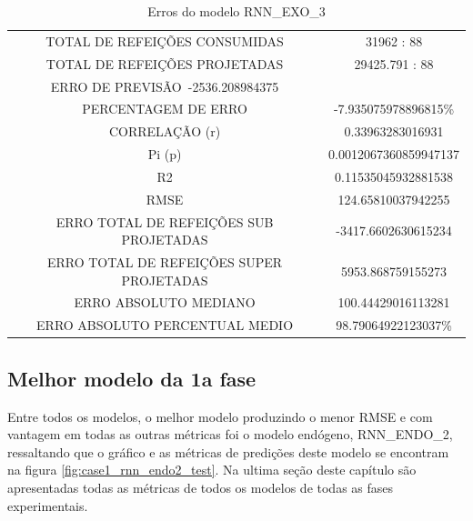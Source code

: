                 \begin{figure}[H]
                \end{figure}
                
                 \begin{table}[!ht]
                \centering
                \caption{Erros do modelo  RNN\_EXO\_3 }
                    \begin{tabular}{|c|c|}
                    \rowcolor{gray!50}
                    \hline
               \multicolumn{2}{c}{ RNN\_EXO\_3:} \\ \hline
                TOTAL DE REFEIÇÕES CONSUMIDAS & 31962 : 88 \\
                TOTAL DE REFEIÇÕES PROJETADAS  & 29425.791 : 88 \\
                ERRO DE PREVISÃO\ -2536.208984375\\ 
                PERCENTAGEM DE ERRO &-7.935075978896815\% \\
                CORRELAÇÃO (r) & 0.33963283016931 \\ Pi (p)& 0.0012067360859947137 \\R2 & 0.11535045932881538\\
                RMSE & 124.65810037942255\\
                ERRO TOTAL DE REFEIÇÕES SUB PROJETADAS & -3417.6602630615234\\
                ERRO TOTAL DE REFEIÇÕES SUPER PROJETADAS & 5953.868759155273\\
                ERRO ABSOLUTO MEDIANO & 100.44429016113281\\
                ERRO ABSOLUTO PERCENTUAL MEDIO & 98.79064922123037\% \\ \hline \end{tabular} \end{table}
            
    	    \subsection{Melhor modelo da 1a fase}
                Entre todos os modelos, o melhor modelo produzindo o menor RMSE e com vantagem em todas as outras métricas foi o modelo endógeno, RNN\_ENDO\_2, ressaltando que o gráfico e as métricas de predições deste modelo se encontram na figura \ref{fig:case1_rnn_endo2_test}.
                Na ultima seção deste capítulo são apresentadas todas as métricas de todos os modelos de todas as fases experimentais.

